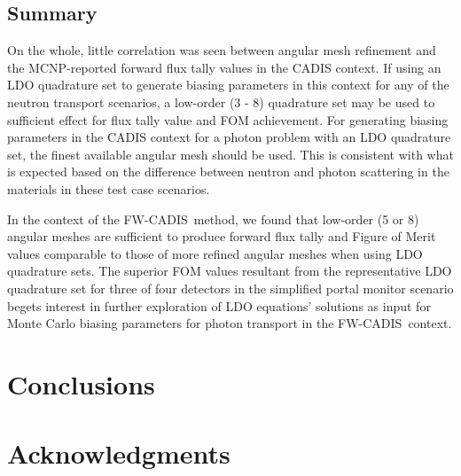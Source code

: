 \documentclass{article} %
\newcommand{\fwc}{\mbox{FW-CADIS}}
\begin{document}
\FloatBarrier
\subsection{Summary}

On the whole, little correlation was seen between angular mesh refinement and
the MCNP-reported forward flux tally values in the CADIS context. If using an
LDO quadrature set to generate biasing parameters in this context for any of
the neutron transport scenarios, a low-order (3 - 8) quadrature set may be used
to sufficient effect for flux tally value and FOM achievement. For generating
biasing parameters in the CADIS context for a photon problem with an LDO
quadrature set, the finest available angular mesh should be used. This is
consistent with what is expected based on the difference between neutron and
photon scattering in the materials in these test case scenarios.

In the context of the \fwc\ method, we found that low-order (5 or 8) angular
meshes are sufficient to produce forward flux tally and Figure of Merit values
comparable to those of more refined angular meshes when using LDO quadrature
sets. The superior FOM values resultant from the representative LDO quadrature
set for three of four detectors in the simplified portal monitor scenario
begets interest in further exploration of LDO equations' solutions as input for
Monte Carlo biasing parameters for photon transport in the \fwc\ context.

\section{Conclusions}
\label{sec:conclusions}

\pagebreak
\section*{Acknowledgments}
\end{document}
